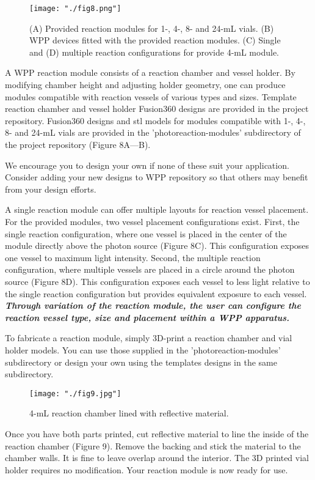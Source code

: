 \documentclass[11pt]{article}
\begin{document}
\begin{figure}[H]
	\texttt{[image: "./fig8.png"]}
	\caption{(A) Provided reaction modules for 1-, 4-, 8- and 24-mL vials. (B) WPP devices fitted with the provided reaction modules. (C) Single and (D) multiple reaction configurations for provide 4-mL module.}
\end{figure}

A WPP reaction module consists of a reaction chamber and vessel holder.
By modifying chamber height and adjusting holder geometry, one can produce modules compatible with reaction vessels of various types and sizes.
Template reaction chamber and vessel holder Fusion360 designs are provided in the project repository.
Fusion360 designs and stl models for modules compatible with 1-, 4-, 8- and 24-mL vials are provided in the 'photoreaction-modules' subdirectory of the project repository (Figure 8A—B).

We encourage you to design your own if none of these suit your application.
Consider adding your new designs to WPP repository so that others may benefit from your design efforts.

A single reaction module can offer multiple layouts for reaction vessel placement.
For the provided modules, two vessel placement configurations exist.
First, the single reaction configuration, where one vessel is placed in the center of the module directly above the photon source (Figure 8C).
This configuration exposes one vessel to maximum light intensity.
Second, the multiple reaction configuration, where multiple vessels are placed in a circle around the photon source (Figure 8D).
This configuration exposes each vessel to less light relative to the single reaction configuration but provides equivalent exposure to each vessel.
\textbf{\textit{Through variation of the reaction module, the user can configure the reaction vessel type, size and placement within a WPP apparatus.}}

To fabricate a reaction module, simply 3D-print a reaction chamber and vial holder models. You can use those supplied in the 'photoreaction-modules' subdirectory or design your own using the templates designs in the same subdirectory.

\begin{figure}[H]
	\centering
	\texttt{[image: "./fig9.jpg"]}
	\caption{4-mL reaction chamber lined with reflective material.}
\end{figure}

Once you have both parts printed, cut reflective material to line the inside of the reaction chamber (Figure 9).
Remove the backing and stick the material to the chamber walls.
It is fine to leave overlap around the interior.
The 3D printed vial holder requires no modification.
Your reaction module is now ready for use.
\end{document}
